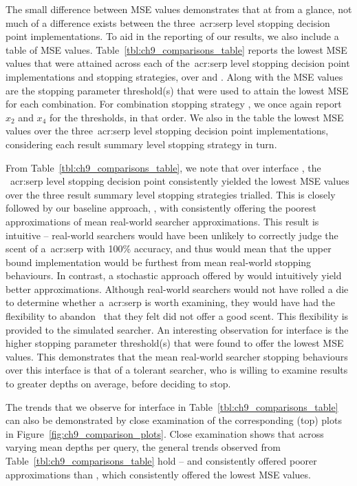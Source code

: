 The small difference between MSE values demonstrates that at from a glance, not much of a difference exists between the three~\gls{acr:serp} level stopping decision point implementations. To aid in the reporting of our results, we also include a table of MSE values. Table~\ref{tbl:ch9_comparisons_table} reports the lowest MSE values that were attained across each of the~\gls{acr:serp} level stopping decision point implementations and stopping strategies, over  and . Along with the MSE values are the stopping parameter threshold(s) that were used to attain the lowest MSE for each combination. For combination stopping strategy , we once again report $x_2$ and $x_4$ for the thresholds, in that order. We also  in the table the lowest MSE values over the three~\gls{acr:serp} level stopping decision point implementations, considering each result summary level stopping strategy in turn.

From Table~\ref{tbl:ch9_comparisons_table}, we note that over interface , the ~\gls{acr:serp} level stopping decision point consistently yielded the lowest MSE values over the three result summary level stopping strategies trialled. This is closely followed by our baseline approach, , with  consistently offering the poorest approximations of mean real-world searcher approximations. This result is intuitive -- real-world searchers would have been unlikely to correctly judge the scent of a~\gls{acr:serp} with 100\% accuracy, and thus would mean that the upper bound  implementation would be furthest from mean real-world stopping behaviours. In contrast, a stochastic approach offered by  would intuitively yield better approximations. Although real-world searchers would not have rolled a die to determine whether a~\gls{acr:serp} is worth examining, they would have had the flexibility to abandon~ that they felt did not offer a good scent. This flexibility is provided to the  simulated searcher. An interesting observation for interface  is the higher stopping parameter threshold(s) that were found to offer the lowest MSE values. This demonstrates that the mean real-world searcher stopping behaviours over this interface is that of a tolerant searcher, who is willing to examine results to greater depths on average, before deciding to stop.

The trends that we observe for interface  in Table~\ref{tbl:ch9_comparisons_table} can also be demonstrated by close examination of the corresponding (top) plots in Figure~\ref{fig:ch9_comparison_plots}. Close examination shows that across varying mean depths per query, the general trends observed from Table~\ref{tbl:ch9_comparisons_table} hold --  and  consistently offered poorer approximations than , which consistently offered the lowest MSE values.

